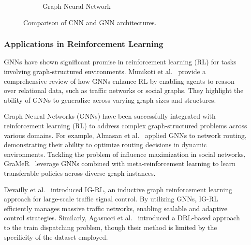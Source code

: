 \documentclass[runningheads]{llncs}
\begin{document}
\begin{figure}[htbp]
\begin{subfigure}[b]{0.45\textwidth}
        \caption{Graph Neural Network}
    \end{subfigure}
    \caption{Comparison of CNN and GNN architectures.}
    \label{fig:cnn_vs_gnn}
\end{figure}


\subsubsection{Applications in Reinforcement Learning}
GNNs have shown significant promise in reinforcement learning (RL) for tasks involving graph-structured environments. Munikoti et al.~\cite{gnndrl:munikoti2022challengesopportunitiesdeepreinforcement} provide a comprehensive review of how GNNs enhance RL by enabling agents to reason over relational data, such as traffic networks or social graphs. They highlight the ability of GNNs to generalize across varying graph sizes and structures.

Graph Neural Networks (GNNs) have been successfully integrated with reinforcement learning (RL) to address complex graph-structured problems across various domains. 
For example, Almasan et al.~\cite{gnndrl:ALMASAN2022184} applied GNNs to network routing, demonstrating their ability to optimize routing decisions in dynamic environments.
Tackling the problem of influence maximization in social networks, GraMeR~\cite{gnndrl:munikoti2022gramergraphmetareinforcement} leverage GNNs combined with meta-reinforcement learning to learn transferable policies across diverse graph instances.

Devailly et al.~\cite{gnndrl:Devailly_2022} introduced IG-RL, an inductive graph reinforcement learning approach for large-scale traffic signal control. 
By utilizing GNNs, IG-RL efficiently manages massive traffic networks, enabling scalable and adaptive control strategies. 
Similarly, Agasucci et al.~\cite{gnndrl:agasucci} introduced a DRL-based approach to the train dispatching problem, though their method is limited by the specificity of the dataset employed.
\end{document}
